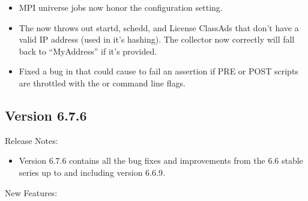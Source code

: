 \begin{itemize}
\item MPI universe jobs now honor the 
configuration setting.

\item The  now throws out startd, schedd, and License
ClassAds that don't have a valid IP address (used in it's hashing).  The
collector now correctly will fall back to ``MyAddress'' if it's provided.

\item Fixed a bug in  that could cause 
to fail an assertion if PRE or POST scripts are throttled with the
 or   command line flags.

\end{itemize}


\subsection*{\label{sec:New-6-7-6}Version 6.7.6}

\noindent Release Notes:

\begin{itemize}

\item Version 6.7.6 contains all the bug fixes and improvements from
  the 6.6 stable series up to and including version 6.6.9.

\end{itemize}

\noindent New Features:

